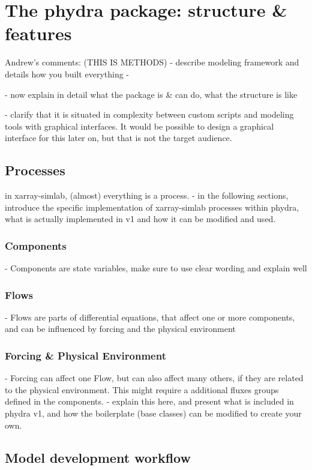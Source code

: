\documentclass[journal abbreviation, manuscript]{copernicus}
\begin{document}
\section{The phydra package: structure \& features}
Andrew's comments: (THIS IS METHODS)
- describe modeling framework and details how you built everything
- 



- now explain in detail what the package is \& can do, what the structure is like

- clarify that it is situated in complexity between custom scripts and modeling tools with graphical interfaces. It would be possible to design a graphical interface for this later on, but that is not the target audience.

\subsection{Processes}
in xarray-simlab, (almost) everything is a process.
- in the following sections, introduce the specific implementation of xarray-simlab processes within phydra, what is actually implemented in v1 and how it can be modified and used.

\subsubsection{Components}
- Components are state variables, make sure to use clear wording and explain well

\subsubsection{Flows}
- Flows are parts of differential equations, that affect one or more components, and can be influenced by forcing and the physical environment

\subsubsection{Forcing & Physical Environment}
- Forcing can affect one Flow, but can also affect many others, if they are related to the physical environment. This might require a additional fluxes groups defined in the components. 
- explain this here, and present what is included in phydra v1, and how the boilerplate (base classes) can be modified to create your own.

\subsection{Model development workflow}
\end{document}
